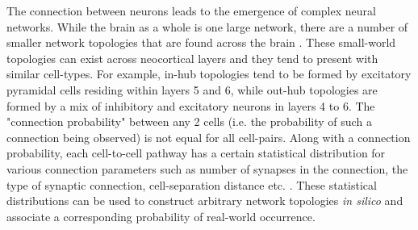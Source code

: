 The connection between neurons leads to the emergence of complex neural networks. While the brain as a whole is one large network, there are a number of smaller network topologies that are found across the brain \cite{bbpTop}. These small-world topologies can exist across neocortical layers and they tend to present with similar cell-types. For example, in-hub topologies tend to be formed by excitatory pyramidal cells residing within layers 5 and 6, while out-hub topologies are formed by a mix of inhibitory and excitatory neurons in layers 4 to 6. The "connection probability" between any 2 cells (i.e. the probability of such a connection being observed) is not equal for all cell-pairs. Along with a connection probability, each cell-to-cell pathway has a certain statistical distribution for various connection parameters such as number of synapses in the connection, the type of synaptic connection, cell-separation distance etc. \cite{bbpTop}. These statistical distributions can be used to construct arbitrary network topologies \emph{in silico} and associate a corresponding probability of real-world occurrence. 

\par

